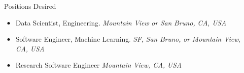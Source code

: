 \begin{rSection}
{Positions Desired}
\begin{itemize}
    \item 
Data Scientist, Engineering.
\hfill 
{\it Mountain View or San Bruno, CA, USA}
\item
Software Engineer, Machine Learning. 
\hfill 
{\it 
SF, San Bruno, or Mountain View,
CA, USA}
\item 
Research Software Engineer
\hfill 
{\it Mountain View, CA, USA}
\end{itemize}
\end{rSection}